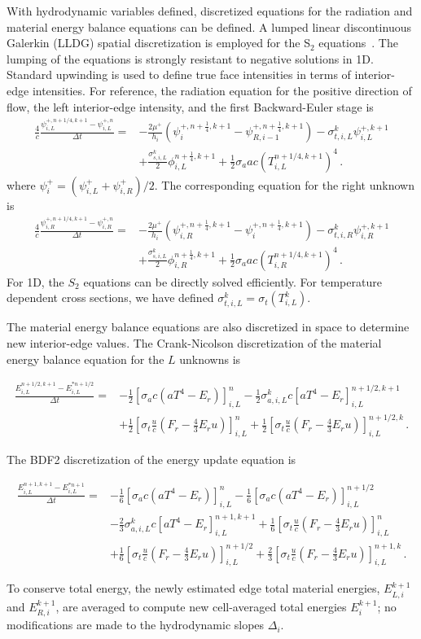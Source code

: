 \documentclass[preprint,12pt]{elsarticle}
\newcommand{\fn}[1]{\left( #1 \right)}
\newcommand{\pep}{\, .}
\newcommand{\lequ}[1]{\label{eq:#1}}
\newcommand{\half}{\frac{1}{2}}
\newcommand{\fourth}{\frac{1}{4}}
\newcommand{\sixth}{\frac{1}{6}}
\newcommand{\E}{{E_r}}
\newcommand{\F}{{F_r}}
\newcommand{\dt}{\Delta t}
\newcommand{\iL}{_{i,L}}
\newcommand{\iR}{_{i,R}}
\newcommand{\energyEmissionSource}{
   \left[\sigma_a c\left(aT^4 - \E\right)\right]
}
\newcommand{\energyEmissionSourceNew}{
   \sigma_{a,i,L}^k c\left[aT^4 - \E\right]
}
\newcommand{\energyDriftSource}{
   \left[\sigma_t\frac{u}{c}\left(\F-\frac{4}{3}\E u\right)\right]
}
\newcommand{\energyUpdateCN}[5]{
\begin{equation}\begin{split}
        \frac{E^{#4,k+1}#3-E^{*#4}#3}{#2\dt} = &
  -\half\energyEmissionSource^{#1}#3
  -\half\energyEmissionSourceNew^{#4,k+1}#3\\
  &+\half\energyDriftSource^{#1}#3
  +\half\energyDriftSource^{#4,k}#3
  \pep
#5
\end{split}\end{equation}
}
\newcommand{\energyUpdateBDFTwo}[6]{
    \begin{equation}\begin{split}
        \frac{E^{#5,k+1}#4-E^{*#5}#4}{#3\dt} = &
  -\sixth\energyEmissionSource^{#1}#4
  -\sixth\energyEmissionSource^{#2}#4\\
  &-\frac{2}{3}\energyEmissionSourceNew^{#5,k+1}#4
   +\sixth\energyDriftSource^{#1}#4\\
  &+\sixth\energyDriftSource^{#2}#4
  +\frac{2}{3}\energyDriftSource^{#5,k}#4
  \pep
#6
\end{split}\end{equation}
}
\begin{document}
With hydrodynamic variables defined, discretized equations for the radiation and material
energy balance equations can be defined.
A lumped linear discontinuous Galerkin (LLDG) spatial discretization is employed
for the S$_2$ equations~\cite{???}.  The lumping of the equations is strongly resistant 
to negative solutions in 1D. Standard upwinding is used to define true face intensities in terms of interior-edge
intensities.
For reference, the radiation equation for
the positive direction of flow, the left interior-edge intensity, and the first Backward-Euler stage is
\begin{equation}
\lequ{S2BEfullL}\begin{split}
  \frac{4}{c}\frac{\psi\iL^{+,n+1/4,k+1}-\psi\iL^{+,n}}{\dt} = &
  -\frac{2\mu^+}{h_i}\fn{\psi^{+,n+\fourth,k+1}_i - \psi^{+,n+\fourth,k+1}_{R,i-1}}
   -\sigma_{t,i,L}^k\psi\iL^{+,k+1}\\
   & +\frac{\sigma_{s,i,L}^k}{2}\phi\iL^{n+\fourth,k+1} +\half\sigma_a a c
   \left(T_{i,L}^{n+1/4,k+1}\right)^4
   \pep
\end{split}
\end{equation}
where $\psi_{i}^+ = (\psi_{i,L}^+ + \psi_{i,R}^+)/2$.  The corresponding equation
for the right unknown is
\begin{equation}
    \lequ{S2BEfullR}\begin{split}
  \frac{4}{c}\frac{\psi\iR^{+,n+1/4,k+1}-\psi\iR^{+,n}}{\dt} = &
  -\frac{2\mu^+}{h_i}\fn{\psi^{+,n+\fourth,k+1}_{i,R} - \psi^{+,n+\fourth,k+1}_{i}}
   -\sigma_{t,i,R}^k\psi\iR^{+,k+1}\\
   & +\frac{\sigma_{s,i,L}^k}{2}\phi\iR^{n+\fourth,k+1} +\half\sigma_a a c
   \left(T_{i,R}^{n+1/4,k+1}\right)^4
   \pep
\end{split}
\end{equation}
For 1D, the $S_2$ equations can be
directly solved efficiently.  For temperature dependent cross sections, we have defined
$\sigma_{t,i,L}^k=\sigma_{t}(T_{i,L}^k)$.

The material energy balance equations are also discretized in space to determine new
interior-edge
values. 
The Crank-Nicolson discretization of the material energy balance equation for the $L$
unknowns is
\energyUpdateCN{n}{}{\iL}{n+1/2}{\lequ{hydroECNfull}}
The BDF2 discretization of the energy update equation is
\energyUpdateBDFTwo{n}{n+1/2}{}{\iL}{n+1}{\lequ{hydroEBDF2full}}
To conserve total energy, the newly estimated edge total
material energies, $E_{L,i}^{k+1}$ and $E_{R,i}^{k+1}$, are averaged to compute new
cell-averaged total energies $E_{i}^{k+1}$; no modifications are made to the hydrodynamic slopes
$\Delta_i$.  
\end{document}
